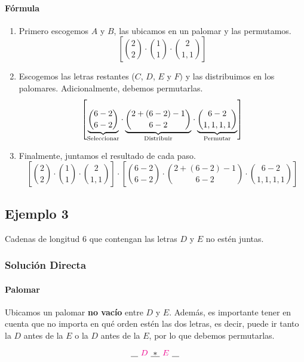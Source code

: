 \paragraph{Fórmula}

\begin{enumerate}
	\item Primero escogemos $A$ y $B$, las ubicamos en un palomar {\color{magenta} y las permutamos}.
	$$\left[\binom{2}{2}\cdot\binom{1}{1}\cdot\binom{2}{1,1}\right]$$
	\item Escogemos las letras restantes ($C$, $D$, $E$ y $F)$ y las distribuimos en los palomares. Adicionalmente, debemos permutarlas.
	\begin{align*}
	\left[\underset{\text{Seleccionar}}{\underbrace{\binom{6-2}{6-2}}}\cdot\underset{\text{Distribuir}}{\underbrace{\binom{2+(6-2)-1}{6-2}}}\cdot\underset{\text{Permutar}}{\underbrace{\binom{6-2}{1,1,1,1}}}\right]
	\end{align*}
	\item Finalmente, juntamos el resultado de cada paso.
	\begin{equation*}
	\left[\binom{2}{2}\cdot\binom{1}{1}\cdot\binom{2}{1,1}\right]
	\cdot
	\left[\binom{6-2}{6-2}\cdot\binom{2+(6-2)-1}{6-2}\cdot\binom{6-2}{1,1,1,1}\right]
	\end{equation*}
\end{enumerate}

\subsection{Ejemplo 3}
Cadenas de longitud 6 que contengan las letras $D$ y $E$ no estén juntas.

\subsubsection{Solución Directa}
\paragraph{Palomar}
Ubicamos un palomar \textbf{no vacío} entre $D$ y $E$. Además, es importante tener en cuenta que no importa en qué orden estén las dos letras, es decir, puede ir tanto la $D$ antes de la $E$ o la $D$ antes de la $E$, por lo que debemos permutarlas.

\begin{equation*}
~\underline{\hspace{0.3cm}}~ {\color{magenta}D} ~\underline{\hspace{0.1cm}*\hspace{0.1cm}}~  {\color{magenta}E} ~\underline{\hspace{0.3cm}}~
\end{equation*}


